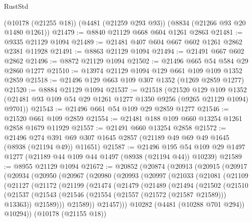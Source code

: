 \begin{lexlean}{RustStd}
\begin{coremodule}
    (@10178 (@21255 @18))
    (@4481 (@21259 @293 @93))
    (@8834 (@21266 @93 @20 @1480 @1261))
@21479 := @8840 @21129 @668 @604 @1261 @2863
@21481 := @9335 @21129 @1094
@21489 := @21481 @407 @604 @667 @602 @1261 @2862 @2381 @11928
@21491 := @8863 @21129 @1094
@21494 := @21491 @667 @602 @2862
@21496 := @8872 @21129 @1094
@21502 := @21496 @665 @54 @584 @29 @2860 @1277
@21510 := @13974 @21129 @1094 @129 @661 @109 @109 @1352 @2859
@21518 := @21496 @129 @663 @109 @307 @1352 (@1269 @2859 @1277)
@21520 := @8884 @21129 @1094
@21537 := @21518
    (@21520
      @129
      @109
      @1352
      (@21481 @93 @109 @54 @29 @1261 @1277 @1350 @9256 (@9265 @21129 @1094) @9701))
@21543 := @21496 @661 @54 @109 @29 @2859 @1277
@21546 := @21520 @661 @109 @2859
@21554 := @21481 @188 @109 @660 @13254 @1261 @2858 @1679 @11929
@21557 := @21491 @660 @13254 @2858
@21572 := @21496
    @274
    @391
    @69
    @307
    @1645
    @2857
    (@21189 @49 @69 @49 @1645 (@8938 (@21194 @49)) @11651)
@21587 := @21496
    @195
    @54
    @109
    @29
    @1497
    @1277
    (@21189 @44 @109 @44 @1497 (@8938 (@21194 @44)) @10239)
@21589 := @8955 @21129 @1094
@21672 := @20852
    (@20874
      (@20913
        (@20915
          (@20917
            (@20934
              (@20950
                (@20967
                  (@20980
                    (@20993
                      (@20997
                        (@21033
                          (@21081
                            (@21109
                              (@21127
                                (@21172
                                  (@21199
                                    (@21474
                                      (@21479
                                        (@21489
                                          (@21494
                                            (@21502
                                              (@21510
                                                (@21537
                                                  (@21543
                                                    (@21546
                                                      (@21554
                                                        (@21557 (@21572 (@21587 @21589)))
                                                        @13363))
                                                    @21589)))
                                              @21589))
                                          @21457)))
                                    @10282
                                    (@4481 (@10288 @701 @294))
                                    @10294))
                                (@10178 (@21155 @18))

\end{coremodule}
\end{lexlean}
